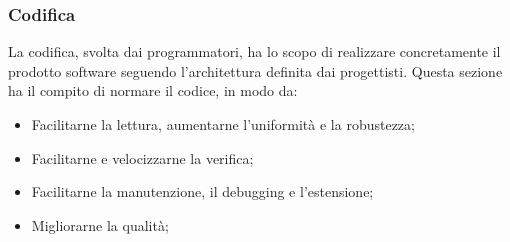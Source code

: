 \documentclass[10pt, a4paper]{article}
\begin{document}
\subsubsection{Codifica}
La codifica, svolta dai programmatori, ha lo scopo di realizzare concretamente il prodotto software seguendo l'architettura definita dai progettisti.
Questa sezione ha il compito di normare il codice, in modo da:
\begin{itemize}
    \item Facilitarne la lettura, aumentarne l'uniformità e la robustezza;
    \item Facilitarne e velocizzarne la verifica;
    \item Facilitarne la manutenzione, il debugging e l'estensione;
    \item Migliorarne la qualità;
\end{itemize}
\end{document}
